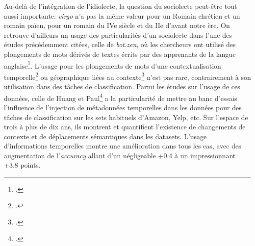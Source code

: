 Au-delà de l'intégration de l'idiolecte, la question du sociolecte peut-être tout aussi importante: \textit{virgo} n'a pas la même valeur pour un Romain chrétien et un romain païen, pour un romain du IVe siècle et du IIe d'avant notre ère. On retrouve d'ailleurs un usage des particularités d'un sociolecte dans l'une des études précédemment citées, celle de \textit{bot.zen}, où les chercheurs ont utilisé des plongements de mots dérivés de textes écrits par des apprenants de la langue anglaise\footcite{stemle_using_2018}. L'usage pour les plongements de mots d'une contextualisation temporelle\footcite{carlo_training_2019} ou géographique liées au contexte\footcite{gong_enriching_2020} n'est pas rare, contrairement à son utilisation dans des tâches de classification. Parmi les études sur l'usage de ces données, celle de Huang et Paul\footcite{huang_neural_2019} a la particularité de mettre au banc d'essais l'influence de l'injection de métadonnées temporelles dans les données pour des tâches de classification sur les sets habituels d'Amazon, Yelp, etc. Sur l'espace de trois à plus de dix ans, ils montrent et quantifient l'existence de changements de contexte et de déplacements sémantiques dans les datasets. L'usage d'informations temporelles montre une amélioration dans tous les cas, avec des augmentation de l'\textit{accuracy} allant d'un négligeable +0.4 à un impressionnant +3.8 points.

